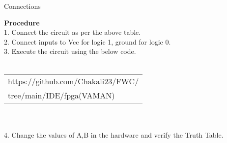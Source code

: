 \documentclass[journal,12pt,twocolumn]{IEEEtran}
\begin{document}
\begin{center}
    Connections
\end{center}
\textbf{Procedure}\\
1. Connect the circuit as per the above table.\\
2. Connect inputs to Vcc for logic 1, ground for logic 0.\\
3. Execute the circuit using the below code.\\
\\\begin{tabularx}{0.45\textwidth} { 
  | >{\centering\arraybackslash}X |
 }
  \hline
https://github.com/Chakali23/FWC/\\tree/main/IDE/fpga(VAMAN)\\
  \hline
\end{tabularx}\\
\\4. Change the values of A,B in the hardware and verify the Truth Table.\\
\end{document}
